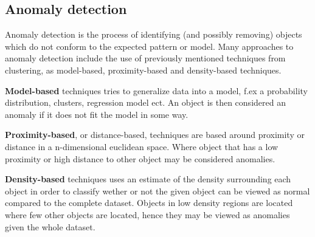 \subsection{Anomaly detection}
	Anomaly detection is the process of identifying (and possibly removing) objects which do not conform to the expected pattern or model. 
	Many approaches to anomaly detection include the use of 
	previously mentioned techniques from clustering, as model-based, proximity-based and density-based techniques. 
	
	\bigskip\noindent
	\textbf{Model-based} techniques tries to generalize data into a model, 
	f.ex a probability distribution, clusters, regression model ect. 
	An object is then considered an anomaly if it does not fit the model in some way. 
	
	\bigskip\noindent
	\textbf{Proximity-based}, or distance-based, techniques are based around proximity or distance in a n-dimensional euclidean space. 
	Where object that has a low proximity or high distance to other object may be considered anomalies.
	
	\bigskip\noindent
	\textbf{Density-based} techniques uses an estimate of the density surrounding each object in order to classify wether or not the given object can be viewed as normal compared to the complete dataset. Objects in low density regions are located where few other objects are located, hence they may be viewed as anomalies given the whole dataset.
	

